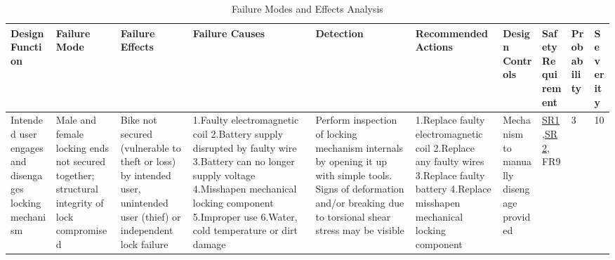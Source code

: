 \documentclass{article}
\begin{document}
\begin{table}[H]
\caption{Failure Modes and Effects Analysis}

\tiny
\begin{tabular}{| p{} | p{}  | p{} | p{} | p{} | p{} | p{} | p{} | p{} |p{} | }
\hline
\textbf{Design Function} & \textbf{Failure Mode} & \textbf{Failure Effects} & \textbf{Failure Causes} & \textbf{Detection} & \textbf{Recommended Actions} & \textbf{Design Controls} & \textbf{Safety Requirement}  & \textbf{Probability} & \textbf{Severity}\\ \hline

Intended user engages and disengages locking mechanism & Male and female locking ends not secured together; structural integrity of lock compromised & Bike not secured (vulnerable to theft or loss) by intended user, unintended user (thief) or independent lock failure & 1.Faulty electromagnetic coil \newline 2.Battery supply disrupted by faulty wire \newline 3.Battery can no longer supply voltage \newline 4.Misshapen mechanical locking component \newline 5.Improper use \newline 6.Water, cold temperature or dirt damage & Perform inspection of locking mechanism internals by opening it up with simple tools. Signs of deformation and/or breaking due to torsional shear stress may be visible & 1.Replace faulty electromagnetic coil \newline 2.Replace any faulty wires \newline 3.Replace faulty battery \newline 4.Replace misshapen mechanical locking component & Mechanism to manually disengage provided & \hyperref[SR1]{SR1},\hyperref[SR2]{SR2}, FR9 & 3 & 10  \\ \hline


\end{tabular}
\end{table}
\end{document}
